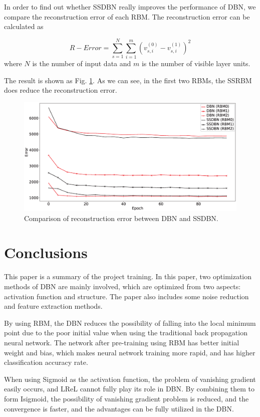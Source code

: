 \documentclass{modified}
\begin{document}
In order to find out whether SSDBN really improves the performance of DBN, we compare the reconstruction error of each RBM. The reconstruction error can be calculated as 

\begin{equation}
R-Error = \sum_{s=1}^{N}\sum_{i=1}^{m}(v_{s,i}^{(0)}-v_{s,i}^{(1)})^2
\end{equation}
where $N$ is the number of input data and $m$ is the number of visible layer units.

The result is shown as Fig. \ref{fig:RBM012}. As we can see, in the first two RBMs, the SSRBM does reduce the reconstruction error.

\begin{figure}[htbp]
	\centering
	\includegraphics[width=\columnwidth]{RBM012.eps}
	\caption{Comparison of reconstruction error between DBN and SSDBN.}
	\label{fig:RBM012}
\end{figure}

\section{Conclusions}
This paper is a summary of the project training. In this paper, two optimization methods of DBN are mainly involved, which are optimized from two aspects: activation function and structure. The paper also includes some noise reduction and feature extraction methods.

By using RBM, the DBN reduces the possibility of falling into the local minimum point due to the poor initial value when using the traditional back propagation neural network. The network after pre-training using RBM has better initial weight and bias, which makes neural network training more rapid, and has higher classification accuracy rate.

When using Sigmoid as the activation function, the problem of vanishing gradient easily occurs, and LReL cannot fully play its role in DBN. By combining them to form Isigmoid, the possibility of vanishing gradient problem is reduced, and the convergence is faster, and the advantages can be fully utilized in the DBN.
\end{document}
